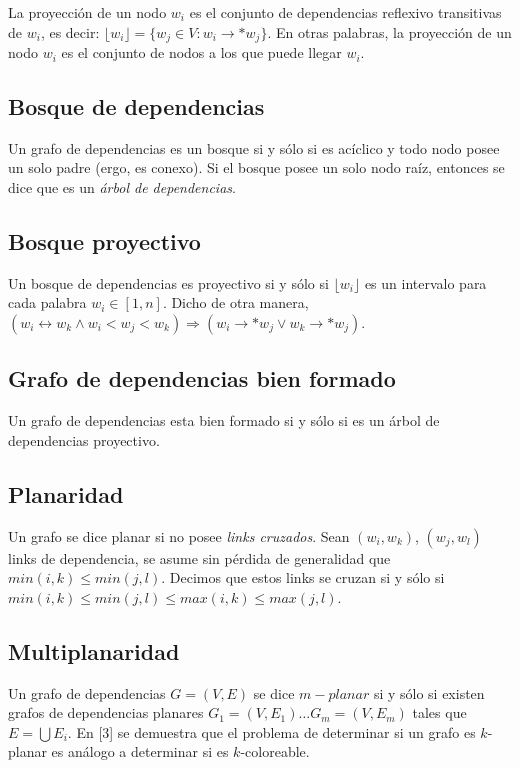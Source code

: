 \documentclass[11pt,a4paper,spanish]{article}
\begin{document}
La proyección de un nodo $w_i$ es el conjunto de dependencias reflexivo transitivas de $w_i$, es 
decir: $\lfloor w_i\rfloor = \{w_j\in V : w_i \rightarrow * w_j\}$. En otras palabras, la proyección
de un nodo $w_i$ es el conjunto de nodos a los que puede llegar $w_i$.

\subsection{Bosque de dependencias} 

Un grafo de dependencias es un bosque si y sólo si es acíclico y todo nodo posee un solo padre 
(ergo, es conexo). Si el bosque posee un solo nodo raíz, entonces se dice que es un \emph{árbol de dependencias}. 

\subsection{Bosque proyectivo}
 
Un bosque de dependencias es proyectivo si y sólo si $\lfloor w_i\rfloor$ es un intervalo para cada palabra $w_i\in [1,n]$. Dicho de otra manera, $(w_i \leftrightarrow w_k \wedge w_i < w_j < w_k) \Rightarrow (w_i \rightarrow * w_j \vee w_k \rightarrow * w_j)$. 

\subsection{Grafo de dependencias bien formado}
 
Un grafo de dependencias esta bien formado si y sólo si es un árbol de dependencias proyectivo.

\subsection{Planaridad}

Un grafo se dice planar si no posee \emph{links cruzados}. Sean $(w_i,w_k)$, $(w_j,w_l)$ links de 
dependencia, se asume sin pérdida de generalidad que $min(i,k) \leq min(j,l)$. Decimos que estos 
links se cruzan si y sólo si $min(i,k)\leq min(j,l)\leq max(i,k)\leq max(j,l)$. 

\subsection{Multiplanaridad}

Un grafo de dependencias $G = (V,E)$ se dice $m-planar$ si y sólo si existen grafos de dependencias planares $G_1 = (V,E_1)\dots G_m = (V,E_m)$ tales que $E = \bigcup E_i$. En [3] se demuestra que el problema de determinar si un grafo es $k$-planar es análogo a determinar si es $k$-coloreable. 
\end{document}
